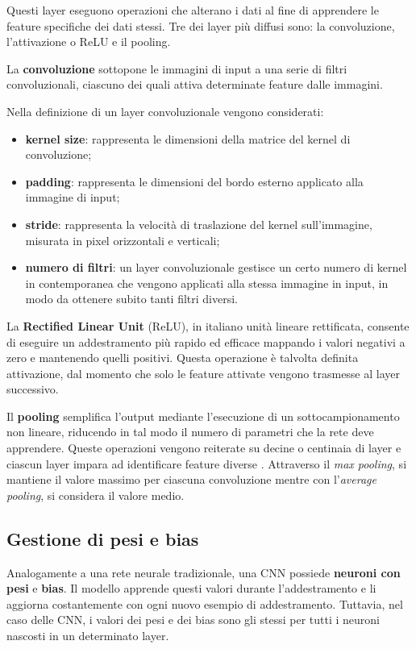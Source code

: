 Questi layer eseguono operazioni che alterano i dati al fine di apprendere le feature specifiche dei dati stessi. Tre dei layer più diffusi sono: la convoluzione, l’attivazione o ReLU e il pooling.

La \textbf{convoluzione} sottopone le immagini di input a una serie di filtri convoluzionali, ciascuno dei quali attiva determinate feature dalle immagini.

Nella definizione di un layer convoluzionale vengono considerati:
\begin{itemize}
    \item \textbf{kernel size}: rappresenta le dimensioni della matrice del kernel di convoluzione;
    \item \textbf{padding}: rappresenta le dimensioni del bordo esterno applicato alla immagine di input;
    \item \textbf{stride}: rappresenta la velocità di traslazione del kernel sull’immagine, misurata in pixel orizzontali e verticali;
    \item \textbf{numero di filtri}: un layer convoluzionale gestisce un certo numero di kernel in contemporanea che vengono applicati alla stessa immagine in input, in modo da ottenere subito tanti filtri diversi.
\end{itemize}

La \textbf{Rectified Linear Unit} (ReLU), in italiano unità lineare rettificata, consente di eseguire un addestramento più rapido ed efficace mappando i valori negativi a zero e mantenendo quelli positivi. Questa operazione è talvolta definita attivazione, dal momento che solo le feature attivate vengono trasmesse al layer successivo.

Il \textbf{pooling} semplifica l’output mediante l’esecuzione di un sottocampionamento non lineare, riducendo in tal modo il numero di parametri che la rete deve apprendere.
Queste operazioni vengono reiterate su decine o centinaia di layer e ciascun layer impara ad identificare feature diverse \cite{mathworks_cnn}.
Attraverso il \textit{max pooling}, si mantiene il valore massimo per ciascuna convoluzione mentre con l'\textit{average pooling}, si considera il valore medio.

\subsection{Gestione di pesi e bias}
Analogamente a una rete neurale tradizionale, una CNN possiede \textbf{neuroni con pesi} e \textbf{bias}. Il modello apprende questi valori durante l’addestramento e li aggiorna costantemente con ogni nuovo esempio di addestramento. Tuttavia, nel caso delle CNN, i valori dei pesi e dei bias sono gli stessi per tutti i neuroni nascosti in un determinato layer.

